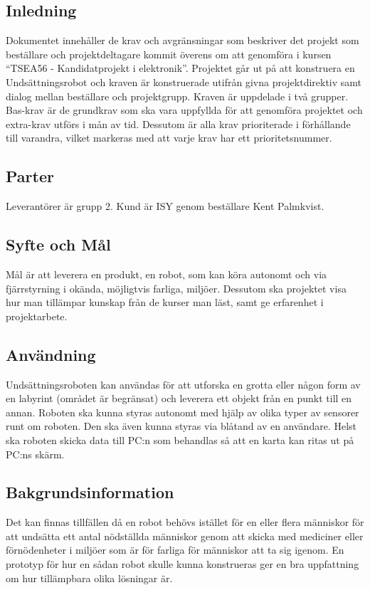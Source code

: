 \documentclass[11pt]{article}
\begin{document}
\pagebreak

\begin{flushleft}

\section{Inledning}

Dokumentet innehåller de krav och avgränsningar som beskriver det projekt som beställare och projektdeltagare kommit överens om att genomföra i kursen “TSEA56 - Kandidatprojekt i elektronik”. Projektet går ut på att konstruera en Undsättningsrobot och kraven är konstruerade utifrån givna projektdirektiv samt dialog mellan beställare och projektgrupp.
Kraven är uppdelade i två grupper. Bas-krav är de grundkrav som ska vara uppfyllda för att genomföra projektet och extra-krav utförs i mån av tid. Dessutom är alla krav prioriterade i förhållande till varandra, vilket markeras med att varje krav har ett prioritetsnummer.

\subsection{Parter}
Leverantörer är grupp 2. Kund är ISY genom beställare Kent Palmkvist.

\subsection{Syfte och Mål}
Mål är att leverera en produkt, en robot, som kan köra autonomt och via fjärrstyrning i okända, möjligtvis farliga, miljöer. Dessutom ska projektet visa hur man tillämpar kunskap från de kurser man läst, samt ge erfarenhet i projektarbete.

\subsection{Användning}
Undsättningsroboten kan användas för att utforska en grotta eller någon form av en labyrint (området är begränsat) och leverera ett objekt från en punkt till en annan. 
Roboten ska kunna styras autonomt med hjälp av olika typer av sensorer runt om roboten. Den ska även kunna styras via blåtand av en användare. 
Helst ska roboten skicka data till PC:n som behandlas så att en karta kan ritas ut på PC:ns skärm.

\subsection{Bakgrundsinformation}
Det kan finnas tillfällen då en robot behövs istället för en eller flera människor för att undsätta ett antal nödställda människor genom att skicka med mediciner eller förnödenheter i miljöer som är för farliga för människor att ta sig igenom. En prototyp för hur en sådan robot skulle kunna konstrueras ger en bra uppfattning om hur tillämpbara olika lösningar är.


\end{flushleft}
\end{document}
